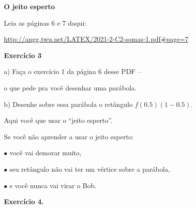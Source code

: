 \documentclass[oneside,12pt]{article}
\begin{document}
{\bf O jeito esperto}

\ssk

Leia as páginas 6 e 7 daqui:

{\footnotesize

\url{http://angg.twu.net/LATEX/2021-2-C2-somas-1.pdf#page=7}

}

\bsk


{\bf Exercício 3}

\ssk

a) Faça o exercício 1 da página 6 desse PDF --

o que pede pra você desenhar uma parábola.

\ssk

b) Desenhe sobre essa parábola o retângulo $f(0.5)(1-0.5)$.

Aqui você  que usar o ``jeito esperto''.

\bsk

Se você não aprender a usar o jeito esperto:

$•$ você vai demorar muito,

$•$ seu retângulo não vai ter um vértice sobre a parábola,

$•$ e você nunca vai virar o Bob.

\newpage


{\bf Exercício 4.}

\def\sumo{\sum_{i=1}^{8}}
\def\sumoo#1{\sumo #1 (x_i - x_{i-1})}
\end{document}
